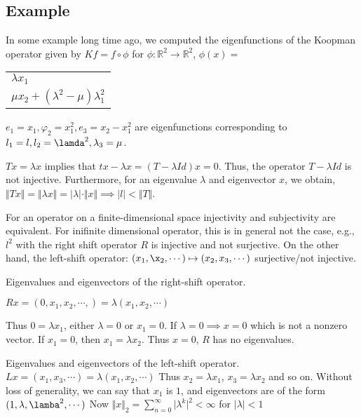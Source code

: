 \documentclass[11pt]{article}
\def\R{\mathbb{R}}
\begin{document}
\subsection{Example}
\label{sec:org68255ae}
In some example long time ago, we computed the eigenfunctions of the Koopman
operator given by \(Kf = f \circ \phi\) for \(\phi \colon \R^2 \rightarrow
   \R^2\), \(\phi(x)=\)

\begin{center}
\begin{tabular}{l}
\(\lambda x_1\)\\
\(\mu x_2 + (\lambda^2 - \mu)\lambda_1^2\)\\
\end{tabular}
\end{center}

\(e_1 = x_1, \varphi_2 = x_1^2, e_3 = x_2 - x_1^2\) are eigenfunctions
corresponding to \(l_1 = l, l_2 = \lamda^2, \lambda_3 = \mu\).

\(Tx = \lambda x\) implies that \(tx - \lambda x = (T - \lambda Id) x = 0\).
Thus, the operator \(T - \lambda Id\) is not injective. Furthermore, for an
eigenvalue \(\lambda\) and eigenvector \(x\), we obtain,\(\Vert T x \Vert = \Vert
   \lambda x \Vert = \vert \lambda \vert \cdot \Vert x \Vert \implies \vert l
   \vert < \Vert T \Vert\).

For an operator on a finite-dimensional space injectivity and subjectivity
are equivalent. For inifinite dimensional operator, this is in general not
the case, e.g., \(l^2\) with the right shift operator \(R\) is injective and not
surjective. On the other hand, the left-shift operator: \((x_1, \x_2, \cdots)
   \mapsto (x_2, x_3, \cdots)\) surjective/not injective.

Eigenvalues and eigenvectors of the right-shift operator.

\(Rx = (0, x_1, x_2, \cdots,) = \lambda(x_1, x_2, \cdots)\)

Thus \(0 = \lambda x_1\), either \(\lambda = 0\) or \(x_1 = 0\). If \(\lambda = 0
   \implies x = 0\) which is not a nonzero vector. If \(x_1 = 0\), then \(x_1 =
   \lambda x_2\). Thus \(x = 0\), \(R\) has no eigenvalues.

Eigenvalues and eigenvectors of the left-shift operator. \(Lx = (x_1, x_3,
   \cdots) = \lambda(x_1, x_2, \cdots)\) Thus \(x_2 = \lambda x_1\), \(x_3 = \lambda
   x_2\) and so on. Without loss of generality, we can say that \(x_1\) is \(1\), and
eigenvectors are of the form \((1, \lambda, \lamba^2, \cdots)\) Now \(\Vert x
   \Vert_2 = \sum_{n = 0}^{\infty} \vert \lambda^k \vert^2 < \infty\) for \(\vert
   \lambda\vert < 1\)
\end{document}
